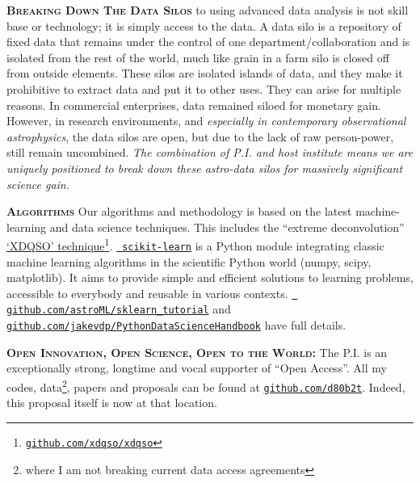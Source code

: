 \documentclass[oneside, a4paper, onecolumn, 11pt]{article}
\begin{document}
\smallskip
\smallskip
\noindent
\textbf{\textsc{Breaking Down The Data Silos}}
to using advanced data analysis is not skill base or technology; it is
simply access to the data.  A data silo is a repository of fixed data
that remains under the control of one department/collaboration and is
isolated from the rest of the world, much like grain in a farm silo is
closed off from outside elements. These silos are isolated islands of
data, and they make it prohibitive to extract data and put it to other
uses. They can arise for multiple reasons. In commercial enterprises,
data remained siloed for monetary gain.  However, in research
environments, and {\it especially in contemporary observational
astrophysics}, the data silos are open, but due to the lack of raw
person-power, still remain uncombined. {\it The combination 
of P.I. and host institute means we are uniquely positioned to 
break down these astro-data silos for massively significant 
science gain.}


\smallskip
\smallskip
\noindent
\textbf{\textsc{Algorithms}}
Our algorithms and methodology is based on the latest machine-learning and data science techniques. 
This includes the ``extreme deconvolution'' \href{http://www.sdss.org/dr14/data\_access/value-added-catalogs/?vac\_id=xdqso/}{`XDQSO' technique}\footnote{\href{https://github.com/xdqso/xdqso}{\tt github.com/xdqso/xdqso}}.
\href{http://ogrisel.github.io/scikit-learn.org/sklearn-tutorial/index.html}{\tt
scikit-learn} is a Python module integrating classic machine learning
algorithms in the scientific Python world (numpy, scipy,
matplotlib). It aims to provide simple and efficient solutions to
learning problems, accessible to everybody and reusable in various
contexts.  \href{https://github.com/astroML/sklearn\_tutorial}{{\tt
github.com/astroML/sklearn\_tutorial}} and \href{https://github.com/jakevdp/PythonDataScienceHandbook}{{\tt github.com/jakevdp/PythonDataScienceHandbook}} have full details.


\smallskip
\smallskip
\noindent
\textbf{\textsc{Open Innovation, Open Science, Open to the World:}} 
The P.I. is an exceptionally strong, longtime and vocal supporter of ``Open Access''. 
All my codes, data\footnote{where I am not breaking current data access agreements}, papers 
and proposals can be found at \href{github.com/d80b2t}{{\tt github.com/d80b2t}}. 
Indeed, this proposal itself is now at that location. 
\end{document}

